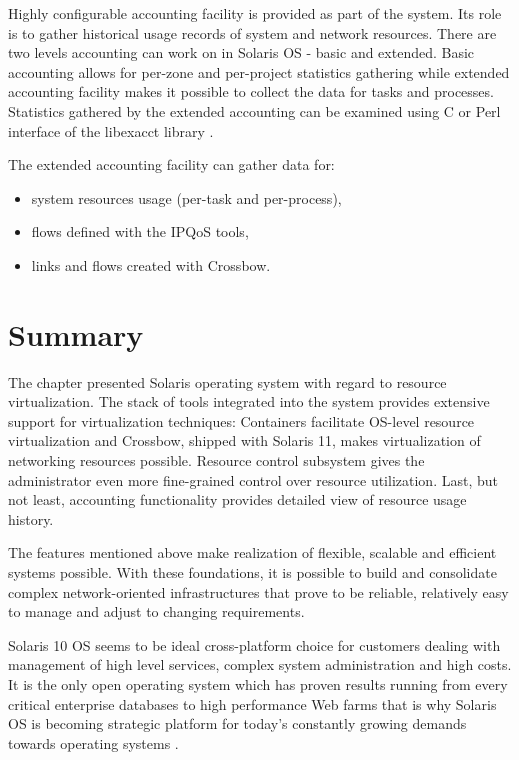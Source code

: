 \documentclass[11pt]{book}
\begin{document}
        Highly configurable accounting facility is provided as part of the system. Its role is to gather historical
        usage records of system and network resources. There are two levels accounting can work on in Solaris
        OS - basic and extended. Basic accounting allows for per-zone and per-project statistics gathering while
        extended accounting facility makes it possible to collect the data for tasks and processes. Statistics gathered
        by the extended accounting can be examined using C or Perl interface of the libexacct library \cite{sag}.

        The extended accounting facility can gather data for:

        \begin{itemize}
          \item system resources usage (per-task and per-process),
          \item flows defined with the IPQoS tools,
          \item links and flows created with Crossbow.
        \end{itemize}

                

    \section*{Summary}

      The chapter presented Solaris operating system with regard to resource virtualization. The stack of tools
      integrated into the system provides extensive support for virtualization techniques: Containers facilitate
      OS-level resource virtualization and Crossbow, shipped with Solaris 11, makes virtualization of networking
      resources possible. Resource control subsystem gives the administrator even more fine-grained control over
      resource utilization. Last, but not least, accounting functionality provides detailed view of resource usage
      history.

      The features mentioned above make realization of flexible, scalable and efficient systems possible. With these
      foundations, it is possible to build and consolidate complex network-oriented infrastructures that prove to be
      reliable, relatively easy to manage and adjust to changing requirements.

      Solaris 10 OS seems to be ideal cross-platform choice for customers dealing with management of high level
      services, complex system administration and high costs. It is the only open operating system which has proven
      results running from every critical enterprise databases to high performance Web farms that is why Solaris OS is
      becoming strategic platform for today's constantly growing demands towards operating systems
      \cite{solaris_operating_system}. 
\end{document}
